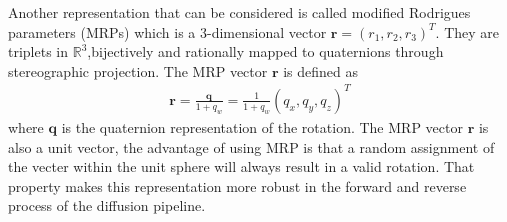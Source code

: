 \documentclass[12pt,DIV14,BCOR12mm,a4paper,footinclude=false,headinclude,parskip=half-,twoside,openright,cleardoublepage=empty,toc=index,bibliography=totoc,listof=totoc]{scrreprt}
\numberwithin{equation}{chapter}
\begin{document}
Another representation that can be considered is called modified Rodrigues parameters (MRPs) which is a 3-dimensional vector $\mathbf{r} = (r_{1}, r_{2}, r_{3})^{T}$. They are triplets in $\mathbb{R}^{3} $,bijectively and rationally mapped to quaternions through stereographic projection\cite{rodrigues}. The MRP vector $\mathbf{r}$ is defined as
\begin{align}
  \mathbf{r} = \frac{\mathbf{q}}{1+q_{w}} = \frac{1}{1+q_{w}}(q_{x}, q_{y}, q_{z})^{T}
\end{align}
where $\mathbf{q}$ is the quaternion representation of the rotation. The MRP vector $\mathbf{r}$ is also a unit vector, the advantage of using MRP is that a random assignment of the vecter within the unit sphere will always result in a valid rotation. That property makes this representation more robust in the forward and reverse process of the diffusion pipeline.
\end{document}
